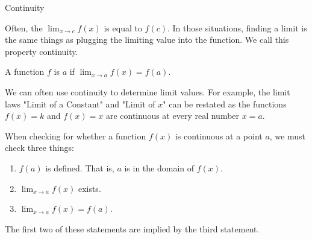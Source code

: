 \documentclass{ximera}
\begin{document}
Continuity

Often, the $\displaystyle \lim_{x\to c}f(x)$ is equal to $f(c)$.  In those situations, finding a limit is the same things as plugging the limiting value into the function.  We call this property continuity.

\begin{definition}
  A function $f$ is  $a$ if $\lim_{x\to a}
  f(x) = f(a)$.
\end{definition}

We can often use continuity to determine limit values.  For example, the limit laws "Limit of a Constant" and "Limit of $x$" can be restated as the functions $f(x)=k$ and  $f(x)=x$ are continuous at every real number $x=a$.

When checking for whether a function $f(x)$ is continuous at a point $a$, we must check three things:
\begin{enumerate}
\item $f(a)$ is defined.  That is, $a$ is in the domain of $f(x)$.
\item $\displaystyle \lim_{x\to a}f(x)$ exists.
\item $\lim_{x\to a} f(x) = f(a)$.
\end{enumerate}

The first two of these statements are implied by the third statement.
\end{document}
